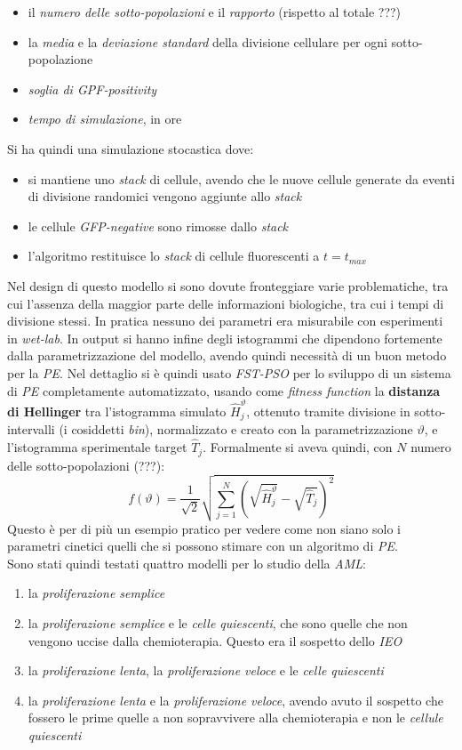 \documentclass[a4paper,12pt, oneside]{book}
\begin{document}
\begin{itemize}
  \item il \textit{numero delle sotto-popolazioni} e il \textit{rapporto}
  (rispetto al totale ???) 
  \item la \textit{media} e la \textit{deviazione standard} della divisione
  cellulare per ogni sotto-popolazione
  \item \textit{soglia di GPF-positivity}
  \item \textit{tempo di simulazione}, in ore
\end{itemize}
Si ha quindi una simulazione stocastica dove:
\begin{itemize}
  \item si mantiene uno \textit{stack} di cellule, avendo che le nuove cellule
  generate 
  da eventi di divisione randomici vengono aggiunte allo \textit{stack}
  \item le cellule \textit{GFP-negative} sono rimosse dallo \textit{stack}
  \item l'algoritmo restituisce lo \textit{stack} di cellule fluorescenti a
  $t=t_{max}$ 
\end{itemize}
Nel design di questo modello si sono dovute fronteggiare varie problematiche,
tra cui l'assenza della maggior parte delle informazioni biologiche, tra cui i
tempi di divisione stessi. In pratica nessuno dei parametri era misurabile con
esperimenti in \textit{wet-lab}. In output si hanno infine degli istogrammi che 
dipendono fortemente dalla parametrizzazione del modello, avendo quindi
necessità di un buon metodo per la \textit{PE}. Nel dettaglio si è quindi usato
\textit{FST-PSO} per lo sviluppo di un sistema di \textit{PE} completamente
automatizzato, usando come \textit{fitness function} la \textbf{distanza di
  Hellinger} tra l'istogramma simulato $\hat{H}_j^\vartheta$, ottenuto tramite
divisione in sotto-intervalli (i cosiddetti \textit{bin}), normalizzato e creato
con la parametrizzazione $\vartheta$, e l'istogramma sperimentale target
$\hat{T}_j$. Formalmente si aveva quindi, con $N$ numero delle sotto-popolazioni
(???): 
\[f(\vartheta)=\frac{1}{\sqrt{2}}\sqrt{\sum_{j=1}^N
    \left(\sqrt{\hat{H}_j^\vartheta}-\sqrt{\hat{T}_j}\right)^{2}}\]
Questo è per di più un esempio pratico per vedere come non siano solo i
parametri cinetici quelli che si possono stimare con un algoritmo di
\textit{PE}.\\
Sono stati quindi testati quattro modelli per lo studio della \textit{AML}:
\begin{enumerate}
  \item la \textit{proliferazione semplice}
  \item la \textit{proliferazione semplice} e le \textit{celle quiescenti}, che
  sono quelle che non vengono uccise dalla chemioterapia. Questo era il
  sospetto dello \textit{IEO}
  \item la \textit{proliferazione lenta}, la \textit{proliferazione veloce} e le
  \textit{celle quiescenti}
  \item la \textit{proliferazione lenta} e la \textit{proliferazione veloce},
  avendo avuto il sospetto che fossero le prime quelle a non sopravvivere alla
  chemioterapia e non le \textit{cellule quiescenti}
\end{enumerate}
\end{document}
